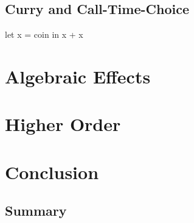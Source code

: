 \documentclass[10pt,a4paper,twoside]{report}
\begin{document}
\section{Curry and Call-Time-Choice}
let x = coin in x + x

\chapter{Algebraic Effects}


\chapter{Higher Order}

\chapter{Conclusion}
\section{Summary}

\printbibliography
\end{document}

